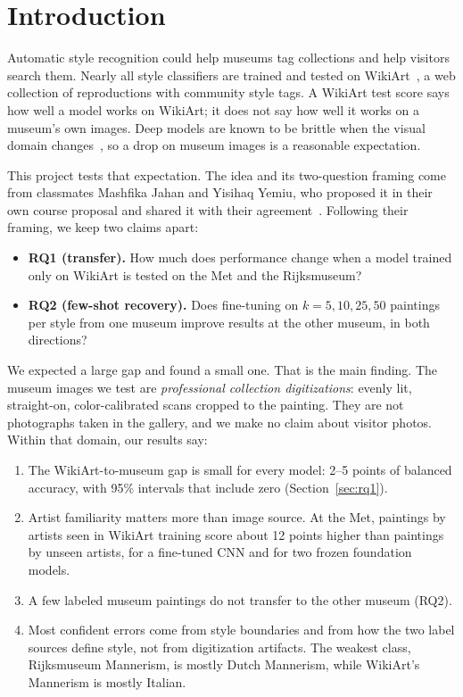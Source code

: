 \documentclass[conference]{IEEEtran}
\begin{document}
\section{Introduction}

Automatic style recognition could help museums tag collections and help visitors search them. Nearly all style classifiers are trained and tested on WikiArt~\cite{karayev2014,saleh2016,tan2016,cetinic2018,zhao2021,zhao2022}, a web collection of reproductions with community style tags. A WikiArt test score says how well a model works on WikiArt; it does not say how well it works on a museum's own images. Deep models are known to be brittle when the visual domain changes~\cite{castellano2021,gulrajani2021}, so a drop on museum images is a reasonable expectation.

This project tests that expectation. The idea and its two-question framing come from classmates Mashfika Jahan and Yisihaq Yemiu, who proposed it in their own course proposal and shared it with their agreement~\cite{jahan2026}. Following their framing, we keep two claims apart:
\begin{itemize}
\item \textbf{RQ1 (transfer).} How much does performance change when a model trained only on WikiArt is tested on the Met and the Rijksmuseum?
\item \textbf{RQ2 (few-shot recovery).} Does fine-tuning on $k = 5, 10, 25, 50$ paintings per style from one museum improve results at the other museum, in both directions?
\end{itemize}

We expected a large gap and found a small one. That is the main finding. The museum images we test are \emph{professional collection digitizations}: evenly lit, straight-on, color-calibrated scans cropped to the painting. They are not photographs taken in the gallery, and we make no claim about visitor photos. Within that domain, our results say:
\begin{enumerate}
\item The WikiArt-to-museum gap is small for every model: 2--5 points of balanced accuracy, with 95\% intervals that include zero (Section~\ref{sec:rq1}).
\item Artist familiarity matters more than image source. At the Met, paintings by artists seen in WikiArt training score about 12 points higher than paintings by unseen artists, for a fine-tuned CNN and for two frozen foundation models.
\item A few labeled museum paintings do not transfer to the other museum (RQ2).
\item Most confident errors come from style boundaries and from how the two label sources define style, not from digitization artifacts. The weakest class, Rijksmuseum Mannerism, is mostly Dutch Mannerism, while WikiArt's Mannerism is mostly Italian.
\end{enumerate}
\end{document}
